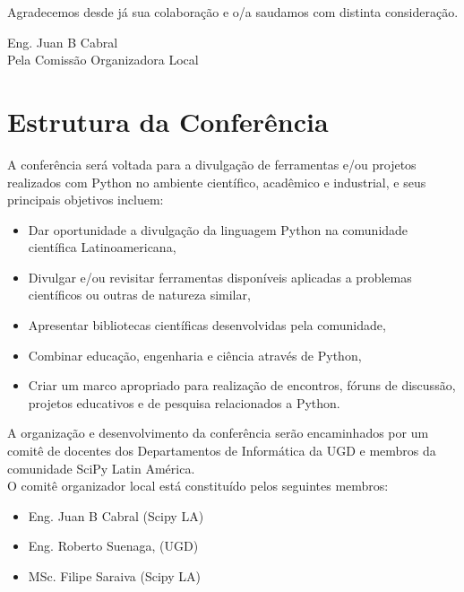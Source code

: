 \documentclass[11pt,a4paper]{report}
\begin{document}
Agradecemos desde já sua colaboração e o/a saudamos
com distinta consideração.\\[0.1cm]



\begin{flushright}
Eng. Juan B Cabral\\
Pela Comissão Organizadora Local \\

\end{flushright}
\newpage
\section*{Estrutura da Conferência}

    A conferência será voltada para a divulgação de ferramentas e/ou
    projetos realizados com Python no ambiente científico, acadêmico e
    industrial, e seus principais objetivos incluem:

  \begin{itemize}
    \item Dar oportunidade a divulgação da linguagem Python na comunidade científica Latinoamericana,
    \item Divulgar e/ou revisitar ferramentas disponíveis aplicadas a problemas científicos ou outras de natureza similar,
    \item Apresentar bibliotecas científicas desenvolvidas pela comunidade,
    \item Combinar educação, engenharia e ciência através de Python,
    \item Criar um marco apropriado para realização de encontros, fóruns de discussão, projetos educativos e de pesquisa relacionados a Python.
  \end{itemize}

A organização e desenvolvimento da conferência serão encaminhados
por um comitê de docentes dos Departamentos de Informática da UGD e
membros da comunidade SciPy Latin América.\\

O comitê organizador local está constituído pelos seguintes membros:\\

\begin{itemize}[nolistsep]
    \item Eng. Juan B Cabral (Scipy LA)
    \item Eng. Roberto Suenaga, (UGD)
    \item MSc. Filipe Saraiva (Scipy LA)
\end{itemize}
\end{document}
